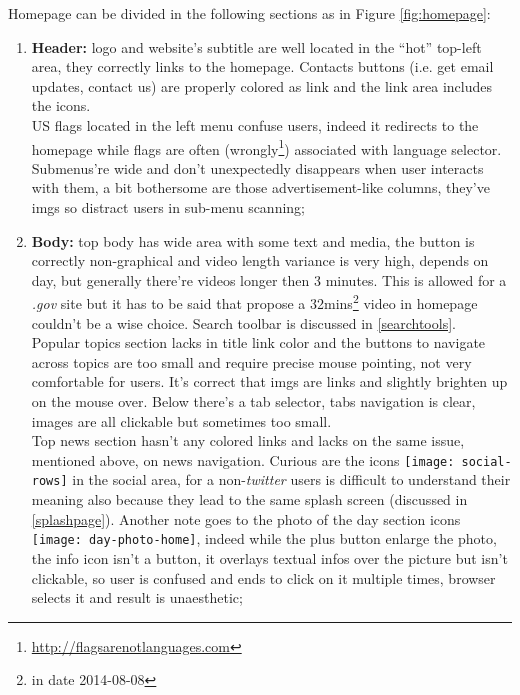 \documentclass[
10pt, %
a4paper, %
oneside, %
headinclude,footinclude, %
BCOR5mm, %
]{scrartcl}
\begin{document}
Homepage can be divided in the following sections as in Figure \ref{fig:homepage}:
	
	\begin{enumerate}
		
		\item \textbf{Header:} logo and website's subtitle are well located in the ``hot'' top-left area, they correctly links to the homepage. Contacts buttons (i.e. get email updates, contact us) are properly colored as link and the link area includes the icons. \\
		US flags located in the left menu confuse users, indeed it redirects to the homepage while flags are often (wrongly\footnote{\href{http://flagsarenotlanguages.com}{http://flagsarenotlanguages.com}}) associated with language selector. \\
		Submenus're wide and don't unexpectedly disappears when user interacts with them, a bit bothersome are those advertisement-like columns, they've imgs so distract users in sub-menu scanning;
		
		\item \textbf{Body:} top body has wide area with some text and media, the button is correctly non-graphical and video length variance is very high, depends on day, but generally there're videos longer then 3 minutes. This is allowed for a \emph{.gov} site but it has to be said that propose a 32mins\footnote{in date 2014-08-08} video in homepage couldn't be a wise choice. Search toolbar is discussed in \ref{searchtools}. \\
		Popular topics section lacks in title link color and the buttons to navigate across topics are too small and require precise mouse pointing, not very comfortable for users. It's correct that imgs are links and slightly brighten up on the mouse over. Below there's a tab selector, tabs navigation is clear, images are all clickable but sometimes too small. \\
		Top news section hasn't any colored links and lacks on the same issue, mentioned above, on news navigation. Curious are the icons \texttt{[image: social-rows]} in the social area, for a non-\emph{twitter} users is difficult to understand their meaning also because they lead to the same splash screen (discussed in \ref{splashpage}). Another note goes to the photo of the day section icons \texttt{[image: day-photo-home]}, indeed while the plus button enlarge the photo, the info icon isn't a button, it overlays textual infos over the picture but isn't clickable, so user is confused and ends to click on it multiple times, browser selects it and result is unaesthetic;
		

\end{enumerate}
\end{document}
